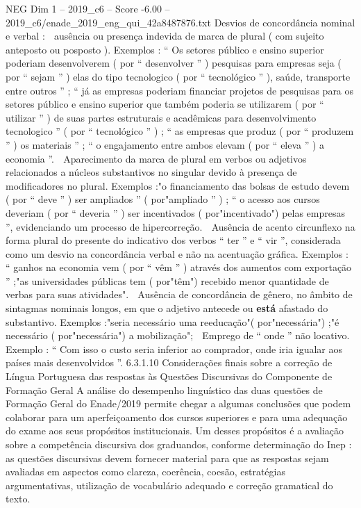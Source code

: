 \begin{textsample}{NEG Dim 1 – 2019\_c6 – Score -6.00 – 2019\_c6/enade\_2019\_eng\_qui\_42a8487876.txt}
Desvios de concordância nominal e verbal :  ausência ou presença indevida de marca de plural ( com sujeito anteposto ou posposto ).
Exemplos : “ Os setores público e ensino superior poderiam desenvolverem ( por “ desenvolver ” ) pesquisas para empresas seja ( por “ sejam ” ) elas do tipo tecnologico ( por “ tecnológico ” ), saúde, transporte entre outros ” ; “ já as empresas poderiam financiar projetos de pesquisas para os setores público e ensino superior que também poderia se utilizarem ( por “ utilizar ” ) de suas partes estruturais e acadêmicas para desenvolvimento tecnologico ” ( por “ tecnológico ” ) ; “ as empresas que produz ( por “ produzem ” ) os materiais ” ; “ o engajamento entre ambos elevam ( por “ eleva ” ) a economia ”.  Aparecimento da marca de plural em verbos ou adjetivos relacionados a núcleos substantivos no singular devido à presença de modificadores no plural.
Exemplos :"o financiamento das bolsas de estudo devem ( por “ deve ” ) ser ampliados ” ( por"ampliado ” ) ; “ o acesso aos cursos deveriam ( por “ deveria ” ) ser incentivados ( por"incentivado") pelas empresas ”, evidenciando um processo de hipercorreção.  Ausência de acento circunflexo na forma plural do presente do indicativo dos verbos “ ter ” e “ vir ”, considerada como um desvio na concordância verbal e não na acentuação gráfica.
Exemplos : “ ganhos na economia vem ( por “ vêm ” ) através dos aumentos com exportação ” ;"as universidades públicas tem ( por"têm") recebido menor quantidade de verbas para suas atividades".  Ausência de concordância de gênero, no âmbito de sintagmas nominais longos, em que o adjetivo antecede ou \textbf{está} afastado do substantivo.
Exemplos :"seria necessário uma reeducação"( por"necessária") ;"é necessário ( por"necessária") a mobilização";  Emprego de “ onde ” não locativo.
Exemplo : “ Com isso o custo seria inferior ao comprador, onde iria igualar aos países mais desenvolvidos ”. 6.3.1.10 Considerações finais sobre a correção de Língua Portuguesa das respostas às Questões Discursivas do Componente de Formação Geral A análise do desempenho linguístico das duas questões de Formação Geral do Enade/2019 permite chegar a algumas conclusões que podem colaborar para um aperfeiçoamento dos cursos superiores e para uma adequação do exame aos seus propósitos institucionais.
Um desses propósitos é a avaliação sobre a competência discursiva dos graduandos, conforme determinação do Inep : as questões discursivas devem fornecer material para que as respostas sejam avaliadas em aspectos como clareza, coerência, coesão, estratégias argumentativas, utilização de vocabulário adequado e correção gramatical do texto.

\end{textsample}
